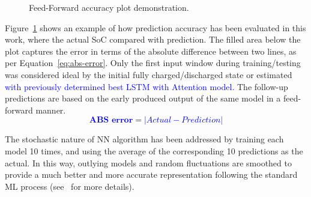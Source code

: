 %
%
 {
\begin{figure}[ht]
    \centering
    
    \caption{Feed-Forward accuracy plot demonstration.}
    \label{fig:plot_demo}
\end{figure}
Figure~\ref{fig:plot_demo} shows an example of how prediction accuracy has been evaluated in this work, where the actual SoC compared with prediction.
The filled area below the plot captures the error in terms of the absolute difference between two lines, as per Equation~\ref{eq:abs-error}.
Only the first input window during training/testing was considered ideal by the initial fully charged/discharged state or estimated \textcolor{blue}{with previously determined best LSTM with Attention model.}
The follow-up predictions are based on the early produced output of the same model in a feed-forward manner.
\textcolor{blue}{
\begin{equation}
    \textbf{ABS error}  = \left | Actual-Prediction \right |
    \label{eq:abs-error}
\end{equation}
}
}
{The stochastic nature of NN algorithm has been addressed by training each model 10 times, and using the average of the corresponding 10 predictions as the actual.
In this way, outlying models and random fluctuations are smoothed to provide a much better and more accurate representation following the standard ML process (see~\cite{sadykov_practical_2022} for more details).}

